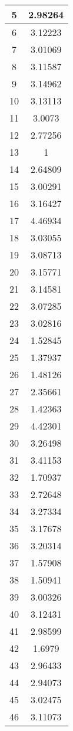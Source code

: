 \begin{table}[h]
\begin{subtable}[h]{2in}
{\begin{tabular}{|c|c|}
5	&	2.98264	\\	\hline
6	&	3.12223	\\	\hline
7	&	3.01069	\\	\hline
8	&	3.11587	\\	\hline
9	&	3.14962	\\	\hline
10	&	3.13113	\\	\hline
11	&	3.0073	\\	\hline
12	&	2.77256	\\	\hline
13	&	1	\\	\hline
14	&	2.64809	\\	\hline
15	&	3.00291	\\	\hline
16	&	3.16427	\\	\hline
17	&	4.46934	\\	\hline
18	&	3.03055	\\	\hline
19	&	3.08713	\\	\hline
20	&	3.15771	\\	\hline
21	&	3.14581	\\	\hline
22	&	3.07285	\\	\hline
23	&	3.02816	\\	\hline
24	&	1.52845	\\	\hline
25	&	1.37937	\\	\hline
26	&	1.48126	\\	\hline
27	&	2.35661	\\	\hline
28	&	1.42363	\\	\hline
29	&	4.42301	\\	\hline
30	&	3.26498	\\	\hline
31	&	3.41153	\\	\hline
32	&	1.70937	\\	\hline
33	&	2.72648	\\	\hline
34	&	3.27334	\\	\hline
35	&	3.17678	\\	\hline
36	&	3.20314	\\	\hline
37	&	1.57908	\\	\hline
38	&	1.50941	\\	\hline
39	&	3.00326	\\	\hline
40	&	3.12431	\\	\hline
41	&	2.98599	\\	\hline
42	&	1.6979	\\	\hline
43	&	2.96433	\\	\hline
44	&	2.94073	\\	\hline
45	&	3.02475	\\	\hline
46	&	3.11073	\\	\hline

\end{tabular}}
\end{subtable}
\end{table}

